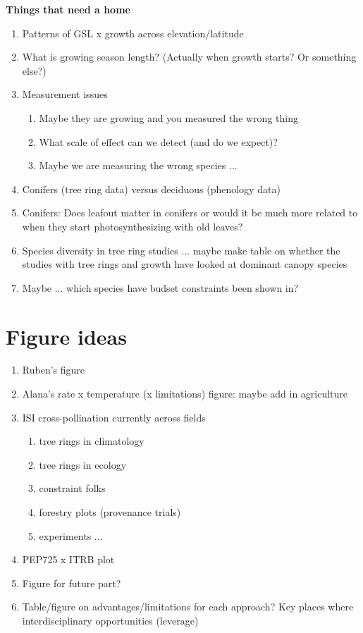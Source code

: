 \documentclass[11pt,letter]{article}
\begin{document}
{\bf Things that need a home}
\begin{enumerate}
\item Patterns of GSL x growth across elevation/latitude
\item What is growing season length? (Actually when growth starts? Or something else?) 
\item Measurement issues
\begin{enumerate}
\item Maybe they are growing and you measured the wrong thing
\item What scale of effect can we detect (and do we expect)?
\item Maybe we are measuring the wrong species ...
\end{enumerate}
\item Conifers (tree ring data) versus deciduous (phenology data)
\item Conifers: Does leafout matter in conifers or would it be much more related to when they start photosynthesizing with old leaves?
\item Species diversity in tree ring studies ... maybe make table on whether the studies with tree rings and growth have looked at dominant canopy species 
\item Maybe ... which species have budset constraints been shown in?
\end{enumerate}

\section{Figure ideas}

\begin{enumerate}
\item Ruben's figure
\item Alana's rate x temperature (x limitations) figure: maybe add in agriculture
\item ISI cross-pollination currently across fields
\begin{enumerate}
\item tree rings in climatology
\item tree rings in ecology
\item constraint folks
\item forestry plots (provenance trials)
\item experiments ... 
\end{enumerate}
\item PEP725 x ITRB plot
\item Figure for future part?
\item Table/figure on advantages/limitations for each approach? Key places where interdisciplinary opportunities (leverage)
\end{enumerate}
\end{document}
